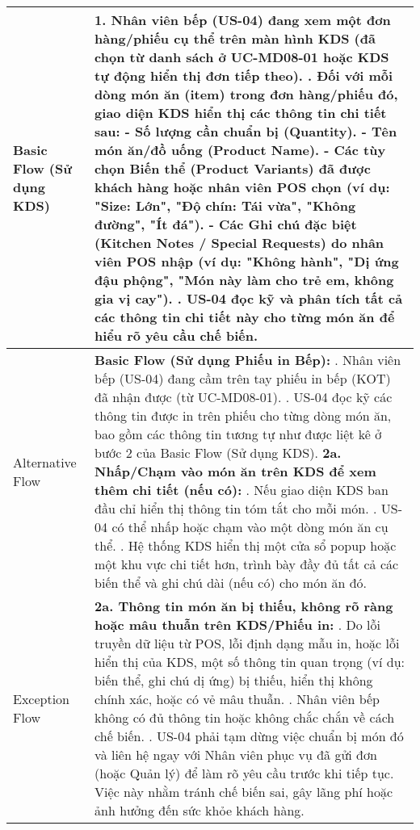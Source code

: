 \begin{longtable}{|m{4cm}|p{11cm}|}
Basic Flow (Sử dụng KDS) & 1. Nhân viên bếp (US-04) đang xem một đơn hàng/phiếu cụ thể trên màn hình KDS (đã chọn từ danh sách ở UC-MD08-01 hoặc KDS tự động hiển thị đơn tiếp theo). \newline 2. Đối với mỗi dòng món ăn (item) trong đơn hàng/phiếu đó, giao diện KDS hiển thị các thông tin chi tiết sau: \newline    - \textbf{Số lượng cần chuẩn bị} (Quantity). \newline    - \textbf{Tên món ăn/đồ uống} (Product Name). \newline    - \textbf{Các tùy chọn Biến thể} (Product Variants) đã được khách hàng hoặc nhân viên POS chọn (ví dụ: "Size: Lớn", "Độ chín: Tái vừa", "Không đường", "Ít đá"). \newline    - \textbf{Các Ghi chú đặc biệt} (Kitchen Notes / Special Requests) do nhân viên POS nhập (ví dụ: "Không hành", "Dị ứng đậu phộng", "Món này làm cho trẻ em, không gia vị cay"). \newline 3. US-04 đọc kỹ và phân tích tất cả các thông tin chi tiết này cho từng món ăn để hiểu rõ yêu cầu chế biến. \\
\hline
Alternative Flow & \textbf{Basic Flow (Sử dụng Phiếu in Bếp):} \newline    1. Nhân viên bếp (US-04) đang cầm trên tay phiếu in bếp (KOT) đã nhận được (từ UC-MD08-01). \newline    2. US-04 đọc kỹ các thông tin được in trên phiếu cho từng dòng món ăn, bao gồm các thông tin tương tự như được liệt kê ở bước 2 của Basic Flow (Sử dụng KDS). \newline \textbf{2a. Nhấp/Chạm vào món ăn trên KDS để xem thêm chi tiết (nếu có):} \newline    1. Nếu giao diện KDS ban đầu chỉ hiển thị thông tin tóm tắt cho mỗi món. \newline    2. US-04 có thể nhấp hoặc chạm vào một dòng món ăn cụ thể. \newline    3. Hệ thống KDS hiển thị một cửa sổ popup hoặc một khu vực chi tiết hơn, trình bày đầy đủ tất cả các biến thể và ghi chú dài (nếu có) cho món ăn đó. \\
\hline
Exception Flow & \textbf{2a. Thông tin món ăn bị thiếu, không rõ ràng hoặc mâu thuẫn trên KDS/Phiếu in:} \newline    1. Do lỗi truyền dữ liệu từ POS, lỗi định dạng mẫu in, hoặc lỗi hiển thị của KDS, một số thông tin quan trọng (ví dụ: biến thể, ghi chú dị ứng) bị thiếu, hiển thị không chính xác, hoặc có vẻ mâu thuẫn. \newline    2. Nhân viên bếp không có đủ thông tin hoặc không chắc chắn về cách chế biến. \newline    3. US-04 phải tạm dừng việc chuẩn bị món đó và liên hệ ngay với Nhân viên phục vụ đã gửi đơn (hoặc Quản lý) để làm rõ yêu cầu trước khi tiếp tục. Việc này nhằm tránh chế biến sai, gây lãng phí hoặc ảnh hưởng đến sức khỏe khách hàng. \\

\end{longtable}
